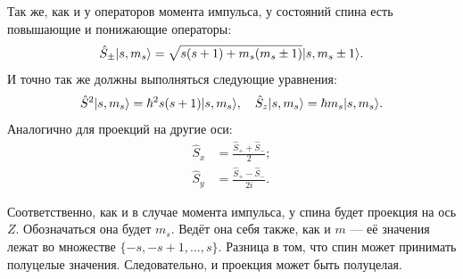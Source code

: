 Так же, как и у операторов момента импульса, у состояний спина есть повышающие
и понижающие операторы:
\[
  \hat{S}_{\pm}\lvert s, m_s\rangle = \sqrt{s(s+1) + m_s(m_s \pm 1)}\lvert s, m_s \pm 1\rangle.
\]
И точно так же должны выполняться следующие уравнения:
\[
  \hat{S}^2\lvert s,m_s\rangle = \hbar^2 s(s+ 1)\lvert s,m_s\rangle, \quad \hat{S}_z\lvert s,m_s\rangle = \hbar m_s\lvert s,m_s\rangle.
\]
Аналогично для проекций на другие оси:
\begin{align*}
  \hat{S}_x & = \frac{\hat{S}_+ + \hat{S}_-}{2};\\
  \hat{S}_y & = \frac{\hat{S}_+ - \hat{S}_-}{2i}.
\end{align*}

Соответственно, как и в случае момента импульса, у спина будет проекция на ось
$Z$. Обозначаться она будет $m_s$. Ведёт она себя также, как и $m$ --- её
значения лежат во множестве $\{-s, -s + 1, ..., s\}$. Разница в том, что спин
может принимать полуцелые значения. Следовательно, и проекция может быть
полуцелая.

